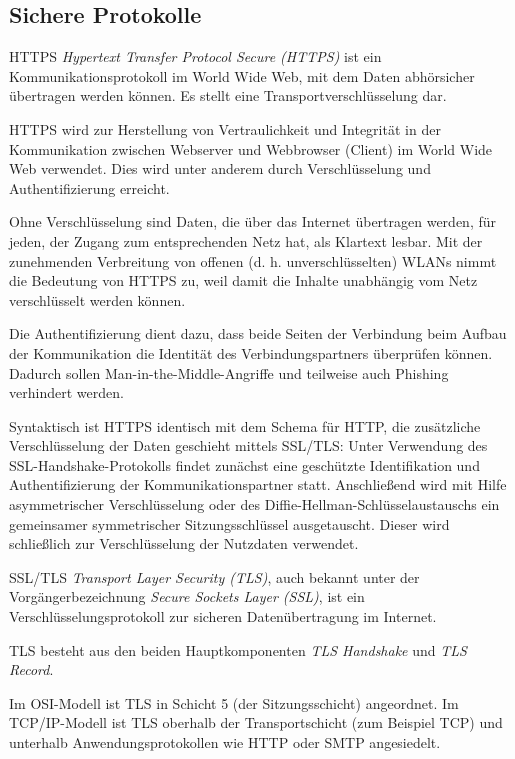 \subsection{Sichere Protokolle}

\begin{defi}{HTTPS}
    \emph{Hypertext Transfer Protocol Secure (HTTPS)}  ist ein Kommunikationsprotokoll im World Wide Web, mit dem Daten abhörsicher übertragen werden können. Es stellt eine Transportverschlüsselung dar.

    HTTPS wird zur Herstellung von Vertraulichkeit und Integrität in der Kommunikation zwischen Webserver und Webbrowser (Client) im World Wide Web verwendet.
    Dies wird unter anderem durch Verschlüsselung und Authentifizierung erreicht.

    Ohne Verschlüsselung sind Daten, die über das Internet übertragen werden, für jeden, der Zugang zum entsprechenden Netz hat, als Klartext lesbar.
    Mit der zunehmenden Verbreitung von offenen (d. h. unverschlüsselten) WLANs nimmt die Bedeutung von HTTPS zu, weil damit die Inhalte unabhängig vom Netz verschlüsselt werden können.

    Die Authentifizierung dient dazu, dass beide Seiten der Verbindung beim Aufbau der Kommunikation die Identität des Verbindungspartners überprüfen können.
    Dadurch sollen Man-in-the-Middle-Angriffe und teilweise auch Phishing verhindert werden.

    Syntaktisch ist HTTPS identisch mit dem Schema für HTTP, die zusätzliche Verschlüsselung der Daten geschieht mittels SSL/TLS: Unter Verwendung des SSL-Handshake-Protokolls findet zunächst eine geschützte Identifikation und Authentifizierung der Kommunikationspartner statt. Anschließend wird mit Hilfe asymmetrischer Verschlüsselung oder des Diffie-Hellman-Schlüsselaustauschs ein gemeinsamer symmetrischer Sitzungsschlüssel ausgetauscht.
    Dieser wird schließlich zur Verschlüsselung der Nutzdaten verwendet.
\end{defi}

\begin{defi}{SSL/TLS}
    \emph{Transport Layer Security (TLS)}, auch bekannt unter der Vorgängerbezeichnung \emph{Secure Sockets Layer (SSL)}, ist ein Verschlüsselungsprotokoll zur sicheren Datenübertragung im Internet.

    TLS besteht aus den beiden Hauptkomponenten \emph{TLS Handshake} und \emph{TLS Record}.

    Im OSI-Modell ist TLS in Schicht 5 (der Sitzungsschicht) angeordnet.
    Im TCP/IP-Modell ist TLS oberhalb der Transportschicht (zum Beispiel TCP) und unterhalb Anwendungsprotokollen wie HTTP oder SMTP angesiedelt.
\end{defi}

